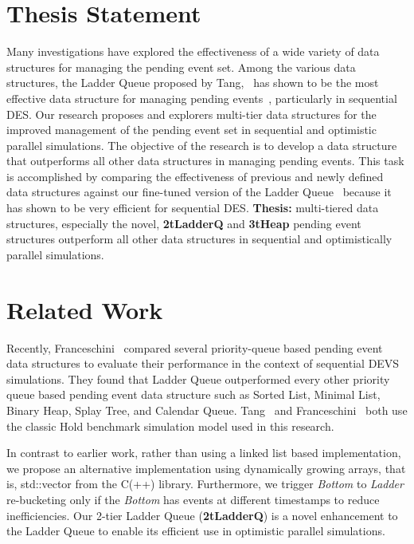 \section*{Thesis Statement}
Many investigations have explored the effectiveness of a wide variety of data structures for managing the pending event set. Among the various data structures, the Ladder Queue proposed by Tang,~\cite{tang-05} has shown to be the most effective data structure for managing pending events~\cite{dickman-13,franceschini-15}, particularly in sequential DES. Our research proposes and explorers multi-tier data structures for the improved management of the pending event set in sequential and optimistic parallel simulations. The objective of the research is to develop a data structure that outperforms all other data structures in managing pending events. This task is accomplished by comparing the effectiveness of previous and newly defined data structures against our fine-tuned version of the Ladder Queue~\cite{tang-05} because it has shown to be very efficient for sequential DES.\newline
\textbf{Thesis:} multi-tiered data structures, especially the novel, \textbf{2tLadderQ} and \textbf{3tHeap} pending event structures outperform all other data structures in sequential and optimistically parallel simulations.

\section*{Related Work}  
Recently, Franceschini~\cite{franceschini-15} compared several priority-queue based pending event data structures to evaluate their performance in the context of sequential DEVS simulations. They found that Ladder Queue outperformed every other priority queue based pending event data structure such as Sorted List, Minimal List, Binary Heap, Splay Tree, and Calendar Queue. Tang~\cite{tang-05} and Franceschini~\cite{franceschini-15} both use the classic Hold benchmark simulation model used in this research.

In contrast to earlier work, rather than using a linked list based implementation, we propose an alternative implementation using dynamically growing arrays, that is, std::vector from the C(++) library. Furthermore, we trigger \textit{Bottom} to \textit{Ladder} re-bucketing only if the \textit{Bottom} has events at different timestamps to reduce inefficiencies. Our 2-tier Ladder Queue (\textbf{2tLadderQ}) is a novel enhancement to the Ladder Queue to enable its efficient use in optimistic parallel simulations.

